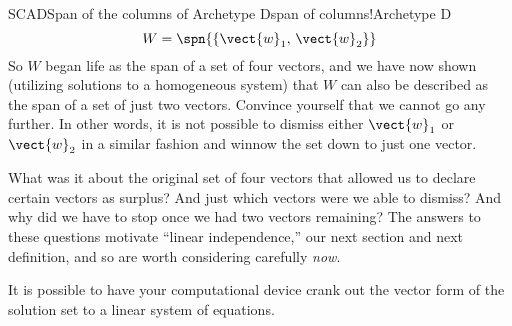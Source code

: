 \begin{example}{SCAD}{Span of the columns of Archetype D}{span of columns!Archetype D}
%
\begin{equation*}
W=\spn{\left\{\vect{w}_1,\,\vect{w}_2\right\}}
\end{equation*}
%
So $W$ began life as the span of a set of four vectors, and we have now shown (utilizing solutions to a homogeneous system) that $W$ can also be described as the span of a set of just two vectors.  Convince yourself that we cannot go any further.  In other words, it is not possible to dismiss either $\vect{w}_1$ or $\vect{w}_2$ in a similar fashion and winnow the set down to just one vector.\par
%
What was it about the original set of four vectors that allowed us to declare certain vectors as surplus?  And just which vectors were we able to dismiss?  And why did we have to stop once we had two vectors remaining?  The answers to these questions motivate ``linear independence,'' our next section and next definition, and so are worth considering carefully {\em now}.
%
\end{example}
%
{It is possible to have your computational device crank out the vector form of the solution set to a linear system of equations.}
{
}{
}
%
